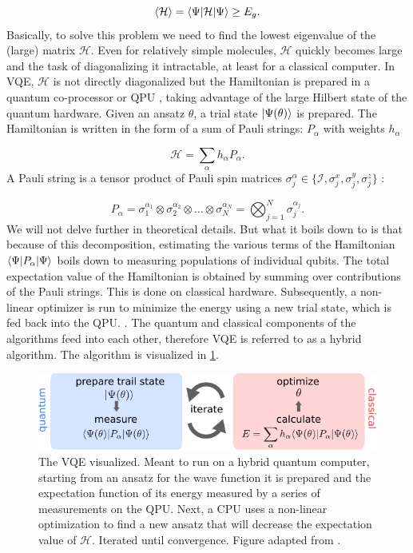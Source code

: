 \begin{equation}\label{eq:VariationalPrinciple}
	\left\langle \mathcal{H} \right\rangle = \langle\Psi\rvert\mathcal{H} \lvert\Psi\rangle \geq E_g.
\end{equation}
Basically, to solve this problem we need to find the lowest eigenvalue of the (large) matrix $\mathcal{H}$. 
Even for relatively simple molecules, $\mathcal{H}$ quickly becomes large and the task of diagonalizing it intractable, at least for a classical computer.
In \ac{VQE}, $\mathcal{H}$ is not directly diagonalized but the Hamiltonian is prepared in a quantum co-processor or \ac{QPU} \cite{Henriet2020,Peruzzo2014}, taking advantage of the large Hilbert state of the quantum hardware.
Given an ansatz $\theta$, a trial state $\lvert\Psi(\theta)\rangle$ is prepared.
The Hamiltonian is written in the form of a sum of Pauli strings: $P_{\alpha}$ with weights $h_{\alpha}$ \cite{McClean2016,Moll2018}

\begin{equation}
	\mathcal{H} = \sum_{\alpha} h_{\alpha} P_{\alpha}.
\end{equation}
A Pauli string is a tensor product of Pauli spin matrices $\sigma_j^{\alpha} \in \{\mathcal{I}, \sigma_j^x, \sigma_j^y, \sigma_j^z\}$ \cite{Griffiths2004}:

\begin{equation}\label{eq:PauliString}
	P_{\alpha} = 
	\sigma_1^{\alpha_1} \otimes \sigma_2^{\alpha_2} \otimes \ldots \otimes \sigma_N^{\alpha_N} = 
	\bigotimes_{j=1}^N \sigma_j^{\alpha_j}.
\end{equation}
We will not delve further in theoretical details. 
But what it boils down to is that because of this decomposition, estimating the various terms of the Hamiltonian $\langle\Psi\rvert P_{\alpha} \lvert\Psi\rangle$ boils down to measuring populations of individual qubits.
The total expectation value of the Hamiltonian is obtained by summing over contributions of the Pauli strings.
This is done on classical hardware.
Subsequently, a non-linear optimizer is run to minimize the energy using a new trial state, which is fed back into the \ac{QPU}.
\cite{Moll2018}. 
The quantum and classical components of the algorithms feed into each other, therefore \ac{VQE} is referred to as a hybrid algorithm. 
The algorithm is visualized in \cref{fig:VQE}.

\begin{figure}
	\centering
	\includegraphics[width=0.85\linewidth]{figures/VQE.pdf}
	\caption{The \ac{VQE} visualized. 
	Meant to run on a hybrid quantum computer, starting from an ansatz for the wave function it is prepared and the expectation function of its energy measured by a series of measurements on the \ac{QPU}.
	Next, a CPU uses a non-linear optimization to find a new ansatz that will decrease the expectation value of $\mathcal{H}$. Iterated until convergence. Figure adapted from \cite{Moll2018}.}
	\label{fig:VQE}
\end{figure}

